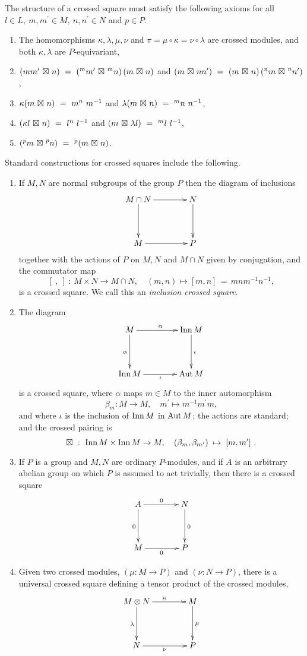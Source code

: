 \documentclass[a4paper,11pt]{article}
\theoremstyle{plain}
\theoremstyle{definition}
\begin{document}
The structure of a crossed square must satisfy the following axioms 
for all $l \in L,~ m,m^{\prime} \in M,~ n,n^{\prime} \in N$ and $p \in P$. 
\begin{enumerate}
\item 
The homomorphisms $\kappa, \lambda, \mu, \nu$ 
and $\pi = \mu\circ\kappa = \nu\circ\lambda$ are crossed modules, 
and both $\kappa, \lambda$ are $P$-equivariant, 
\item
$(mm^{\prime} {\ \boxtimes\ } n) ~=~ (^{m}m^{\prime} {\ \boxtimes\ } {^{m}n})\,(m {\ \boxtimes\ } n)$  
\quad and \quad 
$(m {\ \boxtimes\ } {nn^{\prime}}) ~=~ (m {\ \boxtimes\ } n)\,(^{n}m {\ \boxtimes\ } ^{n}n^{\prime})$, 
\item 
$\kappa(m {\ \bt\ } n) ~=~ m^{n}\ m^{-1}$ 
\quad and \quad 
$\lambda(m {\ \boxtimes\ } n) ~=~ ^{m}n\ n^{-1}$, 
\item 
$(\kappa l {\ \bt\ } n) ~=~ l^{n}\ l^{-1}$  
\quad and \quad 
$(m {\ \boxtimes\ } \lambda l) ~=~ ^{m}l\ l^{-1}$, 
\item 
$(^{p}m {\ \bt\ } ^{p}n) ~=~ ^{p}(m {\ \bt\ } n)$. 
\end{enumerate} 

Standard constructions for crossed squares include the following.
\begin{enumerate}
\item 
If $M,N$ are normal subgroups of the group $P$ then the diagram of inclusions
\[
\xymatrix@R=40pt@C=40pt
{ M \cap N \ar[r]^(0.6){} \ar[d]_{}  
	& N \ar[d]^{} \\
	M \ar[r]_{}  
	& P }
\] 
\noindent together with the actions of $P$ on $M,N$ and $M\cap N$ 
given by conjugation, and the commutator map 
\[
[~,~] ~:~ M\times N \rightarrow M\cap N,\quad 
(m,n)\mapsto [m,n] \,=\, mnm^{-1}n^{-1}, 
\] 
is a crossed square. 
We call this an \emph{inclusion crossed square}.
\item 
The diagram
\[
\xymatrix@R=40pt@C=40pt
{ M \ar[r]^{\alpha} \ar[d]_{\alpha} 
	& \Inn\,M \ar[d]^{\iota} \\
	\Inn\,M \ar[r]_{\iota} 
	& \Aut\,M }
\] 
\noindent is a crossed square, 
where $\alpha $ maps $m\in M$ to the inner automorphism%
\[
\beta_{m} : M \rightarrow M,\quad 
m^{\prime}\mapsto m^{-1}m^{\prime}m, 
\]
and where $\iota $ is the inclusion of $\mathrm{Inn}\,M$ in $\mathrm{Aut}\,M$; 
the actions are standard; and the crossed pairing is
\[
\boxtimes ~:~ \mathrm{Inn}\,M \times \mathrm{Inn}\,M \rightarrow M,\quad 
(\beta_{m},\beta_{m^{\prime}}) \;\mapsto\; [m,m^{\prime}]~.
\]
\item 
If $P$ is a group and $M,N$ are ordinary $P$-modules, 
and if $A$ is an arbitrary abelian group on which $P$ is assumed to act trivially, 
then there is a crossed square
\[
\xymatrix@R=40pt@C=40pt
{ A \ar[r]^{0} \ar[d]_{0}  
	& N \ar[d]^{0} \\
	M \ar[r]_{0} 
	& P }
\]
\item 
Given two crossed modules, $(\mu : M \rightarrow P)$ and $(\nu : N \rightarrow P)$, 
there is a universal crossed square defining a tensor product of the crossed modules, 
\[
\xymatrix@R=40pt@C=40pt
{ M \otimes N \ar[d]_{\lambda} \ar[r]^{\kappa} 
	& M \ar[d]^{\mu} \\ 
	N \ar[r]_{\nu} 
	& P } 
\]
\end{enumerate}
\end{document}
